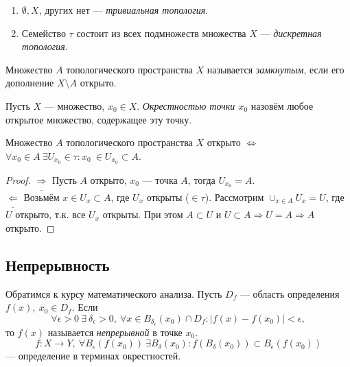 \begin{example}
    \begin{enumerate}
        \item $\emptyset, X$, других нет — \textit{тривиальная топология}.
        \item Семейство $\tau$ состоит из всех подмножеств множества $X$ — \textit{дискретная топология}.
    \end{enumerate}
\end{example}

\begin{definition}
    Множество $A$ топологического пространства $X$ называется \textit{замкнутым}, если его дополнение $X \setminus A$ открыто.
\end{definition}

\begin{definition}
    Пусть $X$ — множество, $x_0 \in X$. \textit{Окрестностью точки $x_0$} назовём любое открытое множество, содержащее эту точку.
\end{definition}

\begin{statement}
    Множество $A$ топологического пространства $X$ открыто $\Longleftrightarrow$ $\forall x_0 \in A \ \exists U_{x_0} \in \tau: x_0 \ \in U_{x_0} \subset A$.
\end{statement}
\begin{proof}
    $\underline{\Longrightarrow}$ Пусть $A$ открыто, $x_0$ — точка $A$, тогда $U_{x_0} = A$. \\
    $\underline{\Longleftarrow}$ Возьмём $x \in U_x \subset A$, где $U_x$ открыты ($\in \tau$).
    Рассмотрим $\cup_{x \in A} U_x = U$, где $U$ открыто, т.к. все $U_x$ открыты.
    При этом $A \subset U$ и $U \subset A \Longrightarrow U = A \Longrightarrow A$ открыто.
\end{proof}

\subsection{Непрерывность}
\begin{definition} Обратимся к курсу математического анализа.
    Пусть $D_f$ — область определения $f(x),\ x_0\in D_f$. Если 
    \[\forall \epsilon>0\ \exists\ \delta_{\epsilon}>0,\ \forall x\in B_{\delta_{\epsilon}}(x_0)\cap D_f: |f(x)-f(x_0)|<\epsilon,\] 
    то $f(x)$ называется \textit{непрерывной} в точке $x_0$. \\
    $$f: X \to Y, \ \forall B_{\epsilon}(f(x_0)) \ \exists B_{\delta}(x_0): f(B_{\delta}(x_0)) \subset B_{\epsilon}(f(x_0))$$ — определение в терминах окрестностей.
\end{definition}

